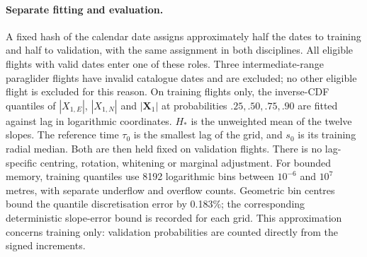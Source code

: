 \paragraph{Separate fitting and evaluation.}
A fixed hash of the calendar date assigns approximately half the dates to
training and half to validation, with the same assignment in both disciplines.
All eligible flights with valid dates enter one of these roles. Three
intermediate-range paraglider flights have invalid catalogue dates and are
excluded; no other eligible flight is excluded for this reason.
On training flights only, the inverse-CDF quantiles of $|X_{1,E}|$, $|X_{1,N}|$
and $|\mathbf X_1|$ at probabilities $.25,.50,.75,.90$ are fitted against lag
in logarithmic coordinates. $H_*$ is the unweighted mean of the twelve slopes.
The reference time $\tau_0$ is the smallest lag of the grid, and $s_0$ is its
training radial median. Both are then held fixed on validation flights.
There is no lag-specific centring, rotation, whitening or marginal adjustment.
For bounded memory, training quantiles use 8192 logarithmic bins between
$10^{-6}$ and $10^7$ metres, with separate underflow and overflow counts.
Geometric bin centres bound the quantile discretisation error by 0.183\%;
the corresponding deterministic slope-error bound is recorded for each grid.
This approximation concerns training only: validation probabilities are counted
directly from the signed increments.

\begin{table}[tb]
 \centering\small
 \caption{Training and validation populations for the two-interval comparison.
 Days and origins refer to validation; the training quantile fit supplies $H_*$.}
 \label{tab:temporal-scaling-population}
 
\end{table}


